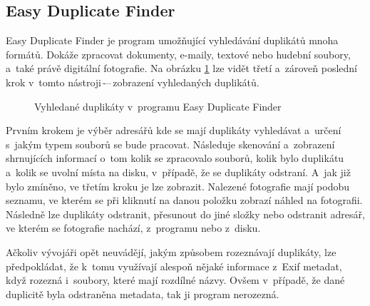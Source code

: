 \subsection*{Easy Duplicate Finder}

Easy Duplicate Finder \cite{EDF} je program umožňující vyhledávání duplikátů mnoha formátů. Dokáže zpracovat dokumenty, e-maily, textové nebo hudební soubory, a~také právě digitální fotografie.
Na obrázku \ref{edf_dupl} lze vidět třetí a~zároveň poslední krok v~tomto nástroji\,-–\,zobrazení vyhledaných duplikátů.

\begin{figure}[h]
\begin{center}
\caption{Vyhledané duplikáty v~programu Easy Duplicate Finder}
\label{edf_dupl}
\end{center}
\end{figure}

Prvním krokem je výběr adresářů kde se mají duplikáty vyhledávat a~určení s~jakým typem souborů se bude pracovat. Následuje skenování a~zobrazení shrnujících informací o~tom kolik se zpracovalo souborů, kolik bylo duplikátu a~kolik se uvolní místa na disku, v~případě, že se duplikáty odstraní. A~jak již bylo zmíněno, ve třetím kroku je lze zobrazit. Nalezené fotografie mají podobu seznamu, ve kterém se při kliknutí na danou položku zobrazí náhled na fotografii. Následně lze duplikáty odstranit, přesunout do jiné složky nebo odstranit adresář, ve kterém se fotografie nachází, z~programu nebo z~disku.

Ačkoliv vývojáři opět neuvádějí, jakým způsobem rozeznávají duplikáty, lze předpokládat, že k~tomu využívají alespoň nějaké informace z~Exif metadat, když rozezná i~soubory, které mají rozdílné názvy. Ovšem v~případě, že dané duplicitě byla odstraněna metadata, tak ji program nerozezná. 

